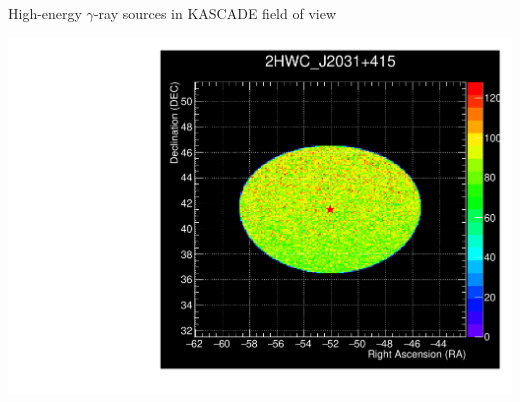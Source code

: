 \begin{frame}{High-energy $\gamma$-ray sources in KASCADE field of view}
\begin{minipage}[c]{0.25\textwidth}
\includegraphics[width=1\textwidth]{pics/Skymap_2HWC_J2031+415.pdf}
\end{minipage}
\end{frame}


